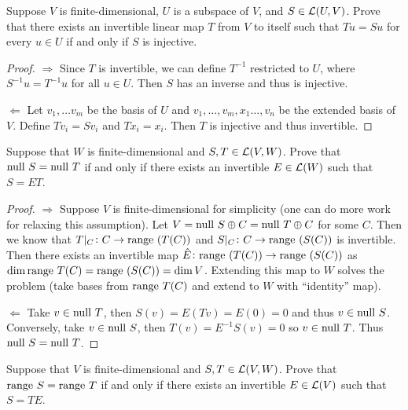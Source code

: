 \documentclass{extarticle}
\begin{document}
\begin{problem}{5}
    Suppose \(V\) is finite-dimensional, \(U\) is a subspace of \(V\), and \(S \in \mathcal{L}(U, V)\). Prove 
    that there exists an invertible linear map \(T\) from \(V\) to itself such that 
    \(T u = Su\) for every \(u \in U\) if and only if \(S\) is injective. 
\end{problem}

\begin{proof}
\(\Rightarrow\) Since \(T\) is invertible, we can define \(T^{-1}\) restricted to \(U\), where 
\(S^{-1} u = T^{-1}u \) for all \(u \in U\). Then \(S\) has an inverse and thus is injective. 

\(\Leftarrow\) Let \(v_1, \ldots v_m\) be the basis of \(U\) and \(v_1, \ldots, v_m, x_1 \ldots, v_n\) 
be the extended basis of \(V\). Define \(T v_i = S v_i\) and \(T x_i = x_i\). Then \(T\) is injective 
and thus invertible. 
\end{proof}

\begin{problem}{6}
    Suppose that \(W\) is finite-dimensional and \(S, T \in \mathcal{L}(V, W)\). Prove that 
    \(\text{null } S = \text{null } T\) if and only if there exists an invertible \(E \in \mathcal{L}(W)\) such that 
    \(S = ET\).  
\end{problem}

\begin{proof}
\(\Rightarrow\) Suppose \(V\) is finite-dimensional for simplicity (one can do more work for 
relaxing this assumption). 
 Let \(V = \text{null } S \oplus C = \text{null } T \oplus C\) for some \(C\). Then we know that 
\(T|_C \colon C \to \text{range } (T(C))\) and \(S|_C \colon C \to \text{range }(S(C))\) is invertible.  Then 
there exists an invertible map \(\hat{E} \colon \text{range }(T(C)) \to \text{range }(S(C))\) as \(\dim \text{range } T(C) 
= \text{range } (S(C)) = \dim V\). Extending this map to \(W\) solves the problem (take bases from \(\text{range } T(C)\)
and extend to \(W\) with ``identity'' map).

\(\Leftarrow\) Take \(v \in \text{null } T\), then \(S(v) = E(Tv) = E(0)  = 0\) and thus \(v \in \text{null } S\). Conversely,
take \(v \in \text{null } S\), then \(T(v) = E^{-1}S(v) = 0\) so \(v \in \text{null } T\). Thus \(\text{null } S = \text{null } T\). 
\end{proof}

\begin{problem}{7}
    Suppose that \(V\) is finite-dimensional and \(S, T \in \mathcal{L}(V, W)\). Prove that \(\text{range } S = \text{range } T\)
    if and only if there exists an invertible \(E \in \mathcal{L}(V)\) such that \(S = TE\). 
\end{problem}
\end{document}

